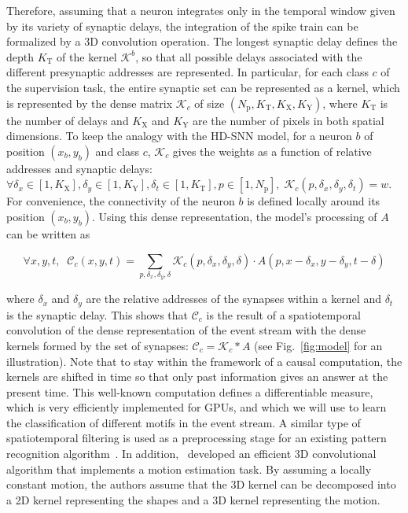 \documentclass[default]{sn-jnl}%
\theoremstyle{thmstyleone}%
\theoremstyle{thmstyletwo}%
\theoremstyle{thmstylethree}%
\newcommand{\seeFig}[1]{see Fig.~\ref{fig:#1}}%
\newcommand{\postsynaddr}{b} %
\newcommand{\Npol}{N_\text{p}} %
\newcommand{\synapticweight}{w} %
\newcommand{\synapticdelay}{\delta} %
\newcommand{\timev}{t} %
\newcommand{\polev}{p} %
\newcommand{\kernel}{\mathcal{K}} %
\newcommand{\Kx}{K_\text{X}}
\newcommand{\Ky}{K_\text{Y}}
\newcommand{\Ktime}{K_\text{T}}
\newcommand{\class}{c} %
\begin{document}
Therefore, assuming that a neuron integrates only in the temporal window given by its variety of synaptic delays, the integration of the spike train can be formalized by a 3D convolution operation. The longest synaptic delay defines the depth $\Ktime$ of the kernel $\kernel^\postsynaddr$, so that all possible delays associated with the different presynaptic addresses are represented. In particular, for each class $\class$ of the supervision task, the entire synaptic set can be represented as a kernel, which is represented by the dense matrix $\kernel_\class$ of size $(\Npol, \Ktime, \Kx, \Ky)$, where $\Ktime$ is the number of delays and $\Kx$ and $\Ky$ are the number of pixels in both spatial dimensions. To keep the analogy with the HD-SNN model, for a neuron $\postsynaddr$ of position $(x_\postsynaddr, y_\postsynaddr)$ and class $\class$, $\kernel_\class$ gives the weights as a function of relative addresses and synaptic delays: $\forall {\delta_x \in [1, \Kx], \delta_y \in [1, \Ky], \delta_\timev \in [1, \Ktime], \polev \in [1, \Npol]}, \; \kernel_\class(\polev, \delta_x, \delta_y, \synapticdelay_\timev) = \synapticweight$. For convenience, the connectivity of the neuron $\postsynaddr$ is defined locally around its position $(x_\postsynaddr, y_\postsynaddr)$. Using this dense representation, the model's processing of $A$ can be written as %
%
\begin{linenomath*}
\begin{equation}\label{eq:kernel_b}
\forall x, y, \timev, \; \;
\mathcal{C}_\class(x, y, \timev)
= \sum_{p, \delta_x, \delta_y, \synapticdelay} \kernel_\class(p, \delta_x, \delta_y, \synapticdelay) \cdot A(p, x - \delta_x, y - \delta_y, \timev-\synapticdelay)
\end{equation}
\end{linenomath*}
%
where $\delta_x$ and $\delta_y$ are the relative addresses of the synapses within a kernel and $\delta_\timev$ is the synaptic delay. 
This shows that $\mathcal{C}_\class$ is the result of a spatiotemporal convolution of the dense representation of the event stream with the dense kernels formed by the set of synapses: $\mathcal{C}_\class = \kernel_\class \ast A$ (\seeFig{model} for an illustration). Note that to stay within the framework of a causal computation, the kernels are shifted in time so that only past information gives an answer at the present time. This well-known computation defines a differentiable measure, which is very efficiently implemented for GPUs, and which we will use to learn the classification of different motifs in the event stream. A similar type of spatiotemporal filtering is used as a preprocessing stage for an existing pattern recognition algorithm~\citep{ghosh_spatiotemporal_2019}. In addition,~\citep{sekikawa_constant_2018} developed an efficient 3D convolutional algorithm that implements a motion estimation task. By assuming a locally constant motion, the authors assume that the 3D kernel can be decomposed into a 2D kernel representing the shapes and a 3D kernel representing the motion.
\end{document}
